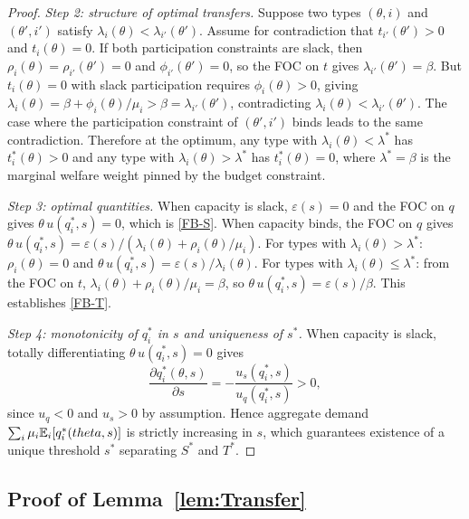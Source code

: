 \documentclass[master.tex]{subfiles}
\begin{document}
\begin{proof}
\textit{Step 2: structure of optimal transfers.} Suppose two types $(\theta,i)$ and $(\theta',i')$ satisfy $\lambda_i(\theta) < \lambda_{i'}(\theta')$. Assume for contradiction that $t_{i'}(\theta') > 0$ and $t_i(\theta) = 0$. If both participation constraints are slack, then $\rho_i(\theta) = \rho_{i'}(\theta') = 0$ and $\phi_{i'}(\theta') = 0$, so the FOC on $t$ gives $\lambda_{i'}(\theta') = \beta$. But $t_i(\theta) = 0$ with slack participation requires $\phi_i(\theta) > 0$, giving $\lambda_i(\theta) = \beta + \phi_i(\theta)/\mu_i > \beta = \lambda_{i'}(\theta')$, contradicting $\lambda_i(\theta) < \lambda_{i'}(\theta')$. The case where the participation constraint of $(\theta', i')$ binds leads to the same contradiction. Therefore at the optimum, any type with $\lambda_i(\theta) < \lambda^*$ has $t_i^*(\theta) > 0$ and any type with $\lambda_i(\theta) > \lambda^*$ has $t_i^*(\theta) = 0$, where $\lambda^* = \beta$ is the marginal welfare weight pinned by the budget constraint.

\textit{Step 3: optimal quantities.} When capacity is slack, $\varepsilon(s) = 0$ and the FOC on $q$ gives $\theta\, u(q_i^*,s) = 0$, which is \eqref{FB-S}. When capacity binds, the FOC on $q$ gives $\theta\, u(q_i^*,s) = \varepsilon(s)/(\lambda_i(\theta) + \rho_i(\theta)/\mu_i)$. For types with $\lambda_i(\theta) > \lambda^*$: $\rho_i(\theta) = 0$ and $\theta\, u(q_i^*,s) = \varepsilon(s)/\lambda_i(\theta)$. For types with $\lambda_i(\theta) \leq \lambda^*$: from the FOC on $t$, $\lambda_i(\theta) + \rho_i(\theta)/\mu_i = \beta$, so $\theta\, u(q_i^*,s) = \varepsilon(s)/\beta$. This establishes \eqref{FB-T}.

\textit{Step 4: monotonicity of $q_i^*$ in $s$ and uniqueness of $s^*$.} When capacity is slack, totally differentiating $\theta\, u(q_i^*,s) = 0$ gives
\[
\frac{\partial q_i^*(\theta,s)}{\partial s} = -\frac{u_s(q_i^*,s)}{u_q(q_i^*,s)} > 0,
\]
since $u_q < 0$ and $u_s > 0$ by assumption. Hence aggregate demand $\sum_i \mu_i \mathbb{E}_i[q_i^*(theta,s)]$ is strictly increasing in $s$, which guarantees existence of a unique threshold $s^*$ separating $S^*$ and $T^*$.
\end{proof}



\subsection{Proof of Lemma~\ref{lem:Transfer}}
\end{document}
